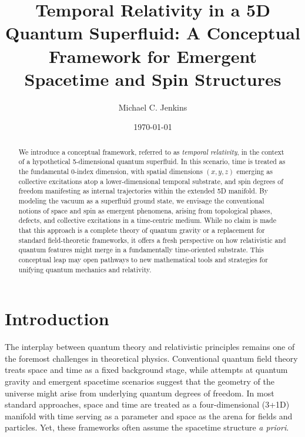 \documentclass[aps,prd,twocolumn,showpacs,showkeys,superscriptaddress,amsmath,amssymb]{revtex4-2}
\begin{document}
\title{Temporal Relativity in a 5D Quantum Superfluid: A Conceptual Framework for Emergent Spacetime and Spin Structures}

\author{Michael C. Jenkins}

\date{\today}

\begin{abstract}
We introduce a conceptual framework, referred to as \emph{temporal relativity}, in the context of a hypothetical 5-dimensional quantum superfluid. In this scenario, time is treated as the fundamental 0-index dimension, with spatial dimensions $(x,y,z)$ emerging as collective excitations atop a lower-dimensional temporal substrate, and spin degrees of freedom manifesting as internal trajectories within the extended 5D manifold. By modeling the vacuum as a superfluid ground state, we envisage the conventional notions of space and spin as emergent phenomena, arising from topological phases, defects, and collective excitations in a time-centric medium. While no claim is made that this approach is a complete theory of quantum gravity or a replacement for standard field-theoretic frameworks, it offers a fresh perspective on how relativistic and quantum features might merge in a fundamentally time-oriented substrate. This conceptual leap may open pathways to new mathematical tools and strategies for unifying quantum mechanics and relativity.
\end{abstract}

\maketitle

\section{Introduction}

The interplay between quantum theory and relativistic principles remains one of the foremost challenges in theoretical physics. Conventional quantum field theory treats space and time as a fixed background stage, while attempts at quantum gravity and emergent spacetime scenarios suggest that the geometry of the universe might arise from underlying quantum degrees of freedom. In most standard approaches, space and time are treated as a four-dimensional (3+1D) manifold with time serving as a parameter and space as the arena for fields and particles. Yet, these frameworks often assume the spacetime structure \emph{a priori}.
\end{document}
